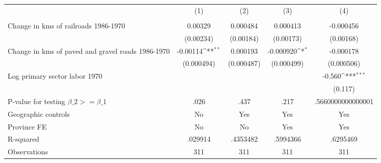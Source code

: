 {
\def\sym#1{\ifmmode^{#1}\else\(^{#1}\)\fi}
\begin{tabular}{l*{4}{c}}
\hline\hline
                &\multicolumn{1}{c}{(1)}&\multicolumn{1}{c}{(2)}&\multicolumn{1}{c}{(3)}&\multicolumn{1}{c}{(4)}\\
                &\multicolumn{1}{c}{}&\multicolumn{1}{c}{}&\multicolumn{1}{c}{}&\multicolumn{1}{c}{}\\
\hline
Change in kms of railroads 1986-1970&  0.00329         & 0.000484         & 0.000413         &-0.000456         \\
                &(0.00234)         &(0.00184)         &(0.00173)         &(0.00168)         \\
[1em]
Change in kms of paved and gravel roads 1986-1970& -0.00114\sym{**} & 0.000193         &-0.000920\sym{*}  &-0.000178         \\
                &(0.000494)         &(0.000487)         &(0.000499)         &(0.000506)         \\
[1em]
Log primary sector labor 1970&                  &                  &                  &   -0.560\sym{***}\\
                &                  &                  &                  &  (0.117)         \\
\hline
P-value for testing $\beta\_{2} >= \beta\_{1}$&     .026         &     .437         &     .217         &.5660000000000001         \\
Geographic controls&       No         &      Yes         &      Yes         &      Yes         \\
Province FE     &       No         &       No         &      Yes         &      Yes         \\
R-squared       &  .029914         & .4353482         & .5994366         & .6295469         \\
Observations    &      311         &      311         &      311         &      311         \\
\hline\hline
\end{tabular}
}
